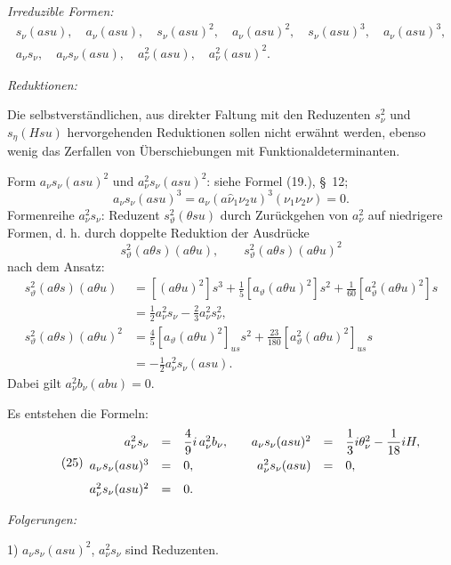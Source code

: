 \documentclass[11pt]{article}
\begin{document}
\noindent\emph{Irreduzible Formen:}
\[
\begin{gathered}
s_\nu(asu),\quad a_\nu(asu),\quad s_\nu(asu)^2,\quad a_\nu(asu)^2,
\quad s_\nu(asu)^3,\quad a_\nu(asu)^3,\\
a_\nu s_\nu,
\quad a_\nu s_\nu(asu),
\quad a_\nu^2(asu),
\quad a_\nu^2(asu)^2.
\end{gathered}
\]

\noindent\emph{Reduktionen:}

Die selbstverständlichen, aus direkter Faltung mit den Reduzenten $s_\nu^2$ und $s_\eta(Hsu)$ hervorgehenden Reduktionen sollen nicht erwähnt werden, ebenso wenig das Zerfallen von Überschiebungen mit Funktionaldeterminanten.

Form $a_\nu s_\nu(asu)^2$ und $a_\nu^2s_\nu(asu)^2$: siehe Formel (19.), \S\ 12;
\[
 a_\nu s_\nu(asu)^3=a_\nu(a\widehat{\nu}_1\nu_2u)^3(\nu_1\nu_2\nu)=0.
\]
Formenreihe $a_\nu^2s_\nu$: Reduzent $s_\vartheta^2(\theta su)$ durch Zurückgehen von $a_\nu^2$ auf niedrigere Formen, d. h. durch doppelte Reduktion der Ausdrücke
\[
 s_\vartheta^2(a\theta s)(a\theta u),
 \qquad s_\vartheta^2(a\theta s)(a\theta u)^2
\]
nach dem Ansatz:
\[
\begin{aligned}
s_\vartheta^2(a\theta s)(a\theta u)
&=[(a\theta u)^2]s^3+\frac15[a_\vartheta(a\theta u)^2]s^2+\frac1{60}[a_\vartheta^2(a\theta u)^2]s\\
&=\frac12a_\nu^2s_\nu-\frac23a_\nu^2s_\nu^2,\\
s_\vartheta^2(a\theta s)(a\theta u)^2
&=\frac45[a_\vartheta(a\theta u)^2]_{us}s^2+\frac{23}{180}[a_\vartheta^2(a\theta u)^2]_{us}s\\
&=-\frac12a_\nu^2s_\nu(asu).
\end{aligned}
\]
Dabei gilt $a_\nu^2b_\nu(abu)=0$.

Es entstehen die Formeln:
\[
\tag{25}
\begin{array}{rcl@{\qquad}rcl}
a_\nu^2s_\nu&=&\dfrac49i\,a_\nu^2b_\nu,
& a_\nu s_\nu(asu)^2&=&\dfrac13i\theta_\nu^2-\dfrac1{18}iH,\\[0.7em]
a_\nu s_\nu(asu)^3&=&0,
& a_\nu^2s_\nu(asu)&=&0,\\[0.7em]
a_\nu^2s_\nu(asu)^2&=&0.
\end{array}
\]

\noindent\emph{Folgerungen:}

1) $a_\nu s_\nu(asu)^2$, $a_\nu^2s_\nu$ sind Reduzenten.
\end{document}
